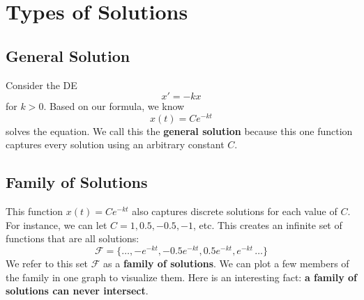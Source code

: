 \documentclass[10pt,letterpaper]{article}
\begin{document}
\section{Types of Solutions}

\subsection{General Solution}
Consider the DE 
$$x'=-kx$$ 
for $k>0$. Based on our formula, we know
$$ x(t) = C e^{-kt}$$
solves the equation. We call this the \textbf{general solution} because this one function captures every solution using an arbitrary constant $C$.

\subsection{Family of Solutions}
This function $x(t)=Ce^{-kt}$ also captures discrete solutions for each value of $C$. For instance, we can let $C=1, 0.5,-0.5,-1$, etc. This creates an infinite set of functions that are all solutions:
$$
\mathcal{F}=\{\ldots,-e^{-kt},-0.5e^{-kt},0.5e^{-kt},e^{-kt}\,\ldots\}
$$
We refer to this set $\mathcal{F}$ as a \textbf{family of solutions}. We can plot a few members of the family in one graph to visualize them. Here is an interesting fact: \textbf{a family of solutions can never intersect}.
\end{document}
